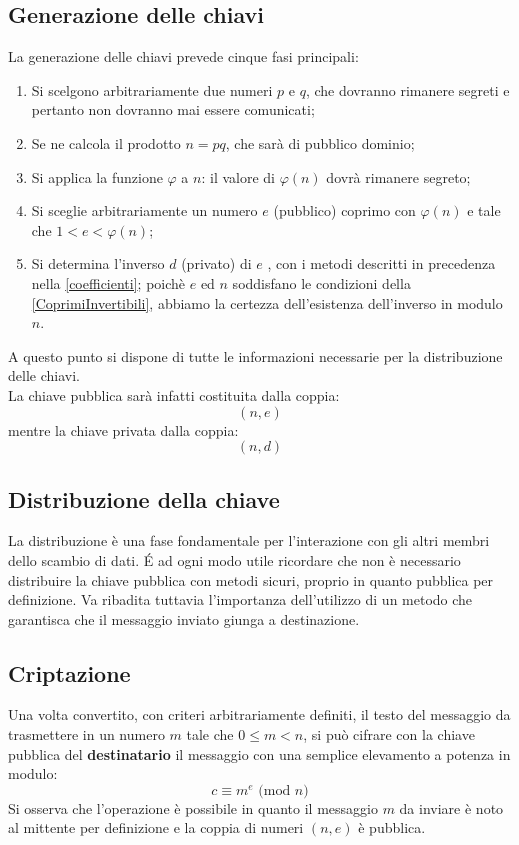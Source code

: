 \documentclass[a4paper,12pt]{article}
\begin{document}
\subsection{Generazione delle chiavi}
La generazione delle chiavi prevede cinque fasi principali:
\begin{enumerate}
    \item Si scelgono arbitrariamente due numeri $p$ e $q$, che dovranno rimanere segreti e pertanto non dovranno mai essere comunicati;
    \item Se ne calcola il prodotto $n=pq$, che sarà di pubblico dominio;
    \item Si applica la funzione $\varphi$ a $n$: il valore di $\varphi(n)$ dovrà rimanere segreto;
    \item Si sceglie arbitrariamente un numero $e$ (pubblico) coprimo con $\varphi(n)$ e tale che $1 < e < \varphi(n)$;
    \item Si determina l'inverso $d$ (privato) di $e$ , con i metodi descritti in precedenza nella \eqref{coefficienti}; poichè $e$ ed $n$ soddisfano le condizioni della \eqref{CoprimiInvertibili}, abbiamo la certezza dell'esistenza dell'inverso in modulo $n$.
\end{enumerate}
A questo punto si dispone di tutte le informazioni necessarie per la distribuzione delle chiavi.\\
La chiave pubblica sarà infatti costituita dalla coppia:
\begin{equation*}
(n,e)
\end{equation*}
mentre la chiave privata dalla coppia:
\begin{equation*}
(n,d)
\end{equation*}

\subsection{Distribuzione della chiave}
La distribuzione è una fase fondamentale per l'interazione con gli altri membri dello scambio di dati. \'E ad ogni modo utile ricordare che non è necessario distribuire la chiave pubblica con metodi sicuri, proprio in quanto pubblica per definizione. Va ribadita tuttavia l'importanza dell'utilizzo di un metodo che garantisca che il messaggio inviato giunga a destinazione.

\subsection{Criptazione}
Una volta convertito, con criteri arbitrariamente definiti, il testo del messaggio da trasmettere in un numero $m$ tale che $0 \leq m < n$, si può cifrare con la chiave pubblica del \textbf{destinatario} il messaggio con una semplice elevamento a potenza in modulo:
\begin{equation}\label{cifratura}
    c \equiv m^e \text{ (mod $n$)}
\end{equation}
Si osserva che l'operazione è possibile in quanto il messaggio $m$ da inviare è noto al mittente per definizione e la coppia di numeri $(n,e)$ è pubblica.
\end{document}
